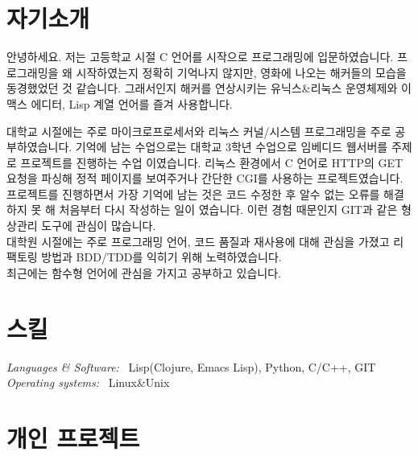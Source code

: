 \documentclass[line,margin]{res}
\begin{document}
\address{E-mail: vmfhrmfoaj@yahoo.com}


\begin{resume}

  \section{자기소개}

  안녕하세요.
  저는 고등학교 시절 C 언어를 시작으로 프로그래밍에 입문하였습니다.
  프로그래밍을 왜 시작하였는지 정확히 기억나지 않지만, 영화에 나오는 해커들의 모습을 동경했었던 것 같습니다.
  그래서인지 해커를 연상시키는 유닉스\&리눅스 운영체제와 이맥스 에디터, Lisp 계열 언어를 즐겨 사용합니다.

  대학교 시절에는 주로 마이크로프로세서와 리눅스 커널/시스템 프로그래밍을 주로 공부하였습니다.
  기억에 남는 수업으로는 대학교 3학년 수업으로 임베디드 웹서버를 주제로 프로젝트를 진행하는 수업 이였습니다.
  리눅스 환경에서 C 언어로 HTTP의 GET 요청을 파싱해 정적 페이지를 보여주거나 간단한 CGI를 사용하는 프로젝트였습니다.
  프로젝트를 진행하면서 가장 기억에 남는 것은 코드 수정한 후 알수 없는 오류를 해결하지 못 해
  처음부터 다시 작성하는 일이 였습니다. 이런 경험 때문인지 GIT과 같은 형상관리 도구에 관심이 많습니다. \\
  대학원 시절에는 주로 프로그래밍 언어, 코드 품질과 재사용에 대해 관심을 가졌고
  리팩토링 방법과 BDD/TDD를 익히기 위해 노력하였습니다. \\
  최근에는 함수형 언어에 관심을 가지고 공부하고 있습니다.



  \section{스킬}

  {\sl Languages \& Software:} ~Lisp({\small Clojure, Emacs Lisp}), Python, C/C++, GIT \\
  {\sl Operating systems:} ~Linux\&Unix


  \section{개인 프로젝트}


\end{resume}
\end{document}
